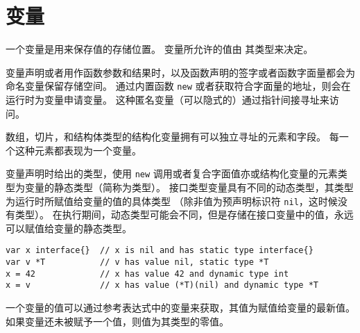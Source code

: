 
\chapter{变量}
一个变量是用来保存值的存储位置。
变量所允许的值由 其类型来决定。

变量声明或者用作函数参数和结果时，以及函数声明的签字或者函数字面量都会为命名变量保留存储空间。
通过内置函数 \lstinline|new| 或者获取符合字面量的地址，则会在运行时为变量申请变量。
这种匿名变量（可以隐式的）通过指针间接寻址来访问。%

数组，切片，和结构体类型的结构化变量拥有可以独立寻址的元素和字段。
每一个这种元素都表现为一个变量。 

变量声明时给出的类型，使用 \lstinline|new| 调用或者复合字面值亦或结构化变量的元素类型为变量的静态类型（简称为类型）。
接口类型变量具有不同的动态类型，其类型为运行时所赋值给变量的值的具体类型
（除非值为预声明标识符 \lstinline|nil|，这时候没有类型）。
在执行期间，动态类型可能会不同，但是存储在接口变量中的值，永远可以赋值给变量的静态类型。
\begin{lstlisting}[style=golang]
var x interface{}  // x is nil and has static type interface{}
var v *T           // v has value nil, static type *T
x = 42             // x has value 42 and dynamic type int
x = v              // x has value (*T)(nil) and dynamic type *T
\end{lstlisting}
一个变量的值可以通过参考表达式中的变量来获取，其值为赋值给变量的最新值。
如果变量还未被赋予一个值，则值为其类型的零值。